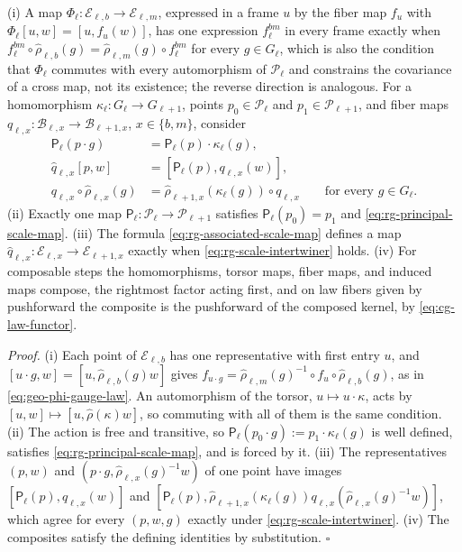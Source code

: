 (i) A map $\Phi_\ell:\mathcal E_{\ell,b}\to\mathcal E_{\ell,m}$, expressed in a frame $u$ by the fiber map
$f_u$ with $\Phi_\ell[u,w]=[u,f_u(w)]$, has one expression $f^{bm}_\ell$ in every frame exactly when
$f^{bm}_\ell\circ\widehat\rho_{\ell,b}(g)=\widehat\rho_{\ell,m}(g)\circ f^{bm}_\ell$ for every $g\in G_\ell$,
which is also the condition that $\Phi_\ell$ commutes with every automorphism of $\mathscr P_\ell$ and
constrains the covariance of a cross map, not its existence; the reverse direction is analogous. For a
homomorphism $\kappa_\ell:G_\ell\to G_{\ell+1}$, points
$p_0\in\mathscr P_\ell$ and $p_1\in\mathscr P_{\ell+1}$, and fiber maps
$q_{\ell,x}:\mathcal B_{\ell,x}\to\mathcal B_{\ell+1,x}$, $x\in\{b,m\}$, consider
\begin{align}
\mathsf P_\ell(p\cdot g)&=\mathsf P_\ell(p)\cdot\kappa_\ell(g),
\label{eq:rg-principal-scale-map}\\
\widehat q_{\ell,x}[p,w]&=[\mathsf P_\ell(p),q_{\ell,x}(w)],
\label{eq:rg-associated-scale-map}\\
q_{\ell,x}\circ\widehat\rho_{\ell,x}(g)&=\widehat\rho_{\ell+1,x}(\kappa_\ell(g))\circ q_{\ell,x}
\qquad\text{for every }g\in G_\ell.
\label{eq:rg-scale-intertwiner}
\end{align}
(ii) Exactly one map $\mathsf P_\ell:\mathscr P_\ell\to\mathscr P_{\ell+1}$ satisfies $\mathsf P_\ell(p_0)=p_1$
and \eqref{eq:rg-principal-scale-map}. (iii) The formula \eqref{eq:rg-associated-scale-map} defines a map
$\widehat q_{\ell,x}:\mathcal E_{\ell,x}\to\mathcal E_{\ell+1,x}$ exactly when \eqref{eq:rg-scale-intertwiner}
holds. (iv) For composable steps the homomorphisms, torsor maps, fiber maps, and induced maps compose, the
rightmost factor acting first, and on law fibers given by pushforward the composite is the pushforward of
the composed kernel, by \eqref{eq:cg-law-functor}. 

\noindent\emph{Proof.}
(i) Each point of $\mathcal E_{\ell,b}$ has one representative with first entry $u$, and
$[u\cdot g,w]=[u,\widehat\rho_{\ell,b}(g)w]$ gives
$f_{u\cdot g}=\widehat\rho_{\ell,m}(g)^{-1}\circ f_u\circ\widehat\rho_{\ell,b}(g)$, as in
\eqref{eq:geo-phi-gauge-law}. An automorphism of the torsor, $u\mapsto u\cdot\kappa$, acts by
$[u,w]\mapsto[u,\widehat\rho(\kappa)w]$, so commuting with all of them is the same condition. (ii) The
action is free and transitive, so $\mathsf P_\ell(p_0\cdot g):=p_1\cdot\kappa_\ell(g)$ is well defined,
satisfies \eqref{eq:rg-principal-scale-map}, and is forced by it. (iii) The representatives $(p,w)$ and
$(p\cdot g,\widehat\rho_{\ell,x}(g)^{-1}w)$ of one point have images $[\mathsf P_\ell(p),q_{\ell,x}(w)]$ and
$[\mathsf P_\ell(p),\widehat\rho_{\ell+1,x}(\kappa_\ell(g))q_{\ell,x}(\widehat\rho_{\ell,x}(g)^{-1}w)]$, which
agree for every $(p,w,g)$ exactly under \eqref{eq:rg-scale-intertwiner}. (iv) The composites satisfy the
defining identities by substitution. $\square$

